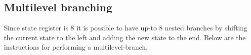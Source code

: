 

\subsection{Multilevel branching}
Since state register is 8 it is possible to have up-to 8 nested branches by
shifting the current state to the left and adding the new state to the
end. Below  are the
instructions for performing a multilevel-branch.


